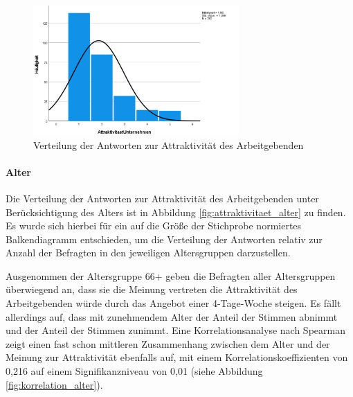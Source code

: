 \begin{figure}[h][h]
    \centering
    \includegraphics[width=0.7\textwidth]{04_Artefakte/01_Abbildungen/hypothese_5/attraktivitaet_histogram.png}
    \caption{Verteilung der Antworten zur Attraktivität des Arbeitgebenden}
    \label{fig:attraktivitaet_verteilung}
\end{figure}

\paragraph*{Alter}


Die Verteilung der Antworten zur Attraktivität des Arbeitgebenden unter Berücksichtigung des Alters ist in Abbildung \ref{fig:attraktivitaet_alter}
zu finden. Es wurde sich hierbei für ein auf die Größe der Stichprobe normiertes Balkendiagramm entschieden, um die Verteilung der Antworten
relativ zur Anzahl der Befragten in den jeweiligen Altersgruppen darzustellen.

Ausgenommen der Altersgruppe 66+ geben die Befragten aller Altersgruppen überwiegend an, dass sie die Meinung vertreten die 
Attraktivität des Arbeitgebenden würde durch das Angebot einer 4-Tage-Woche steigen. Es fällt allerdings auf, dass mit 
zunehmendem Alter der Anteil der  Stimmen abnimmt und der Anteil der  Stimmen zunimmt. Eine 
Korrelationsanalyse nach Spearman zeigt einen fast schon mittleren Zusammenhang zwischen dem 
Alter und der Meinung zur Attraktivität ebenfalls auf, mit einem Korrelationskoeffizienten von 0,216 auf einem Signifikanzniveau von 
0,01 (siehe Abbildung \ref{fig:korrelation_alter}).

